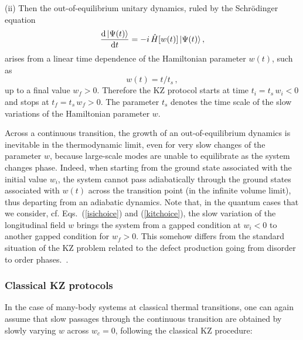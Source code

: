 (ii) Then the out-of-equilibrium unitary dynamics, ruled by the
Schr\"odinger equation
  \begin{equation}
    {{\rm d} \, |\Psi(t)\rangle \over {\rm d} t} =
    - i \, \hat H[w(t)] \, |\Psi(t)\rangle \,,
    \label{unitdyn}
  \end{equation}
  arises from a linear time dependence of the Hamiltonian parameter
  $w(t)$, such as
  \begin{equation}
    w(t) = t/t_s \,,
    \label{wtkz}
  \end{equation}
  up to a final value $w_f>0$. Therefore the KZ protocol starts at
  time $t_i = t_s \, w_i<0$ and stops at $t_f= t_s \, w_f>0$.  The
  parameter $t_s$ denotes the time scale of the slow variations of the
  Hamiltonian parameter $w$.

Across a continuous transition, the growth of an out-of-equilibrium
dynamics is inevitable in the thermodynamic limit, even for very slow
changes of the parameter $w$, because large-scale modes are unable to
equilibrate as the system changes phase. Indeed, when starting from
the ground state associated with the initial value $w_i$, the system
cannot pass adiabatically through the ground states associated with
$w(t)$ across the transition point (in the infinite volume limit),
thus departing from an adiabatic dynamics.  Note that, in the quantum
cases that we consider, cf. Eqs.~(\ref{isichoice}) and
(\ref{kitchoice}), the slow variation of the longitudinal field $w$
brings the system from a gapped condition at $w_i<0$ to another gapped
condition for $w_f>0$. This somehow differs from the standard
situation of the KZ problem related to the defect production going
from disorder to order phases.~\cite{Kibble-76, Kibble-80, Zurek-85,
  Zurek-96, ZDZ-05, Polkovnikov-05, Dziarmaga-05, PG-08, Dziarmaga-10,
  Dutta-etal-book, CEGS-12, PSSV-11, Damski-05, USF-07, USF-10,
  NDP-13, DZ-14}.







\subsubsection{Classical KZ protocols}
\label{cloneway}

In the case of many-body systems at classical thermal transitions, one
can again assume that slow passages through the continuous transition
are obtained by slowly varying $w$ across $w_c = 0$, following the 
classical KZ procedure:

